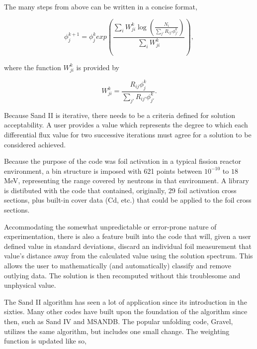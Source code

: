 The many steps from above can be written in a concise format,

\begin{equation}\label{eqn:sandii}
\phi_j^{k + 1} = \phi_j^{k} exp(\frac{\sum_i W_{ji}^k \log(\frac{N_i}{\sum_{j'} R_{ij'} \phi_{j'}^k})}{\sum_i W_{ji}^k}) ,
\end{equation}

where the function $W_{ji}^k$ is provided by

\begin{equation}\label{eqn:sandii-w}
W_{ji}^k = \frac{R_{ij} \phi_{j}^k}{\sum_{j'} R_{ij'} \phi_{j'}^k} .
\end{equation}

Because Sand II is iterative, there needs to be a criteria defined for solution acceptability.
A user provides a value which represents the degree to which each differential flux value for two successive iterations must agree for a solution to be considered achieved.

Because the purpose of the code was foil activation in a typical fission reactor environment, a bin structure is imposed with 621 points between $10^{-10}$ to $18$ MeV, representing the range covered by neutrons in that environment.
A library is distibuted with the code that contained, originally, 29 foil activation cross sections, plus built-in cover data (Cd, etc.) that could be applied to the foil cross sections.

Accommodating the somewhat unpredictable or error-prone nature of experimentation, there is also a feature built into the code that will, given a user defined value in standard deviations, discard an individual foil measurement that value's distance away from the calculated value using the solution spectrum.
This allows the user to mathematically (and automatically) classify and remove outlying data.
The solution is then recomputed without this troublesome and unphysical value.

The Sand II algorithm has seen a lot of application since its introduction in the sixties.
Many other codes have built upon the foundation of the algorithm since then, such as Sand IV and MSANDB.
The popular unfolding code, Gravel, utilizes the same algorithm, but includes one small change.
The weighting function is updated like so,

